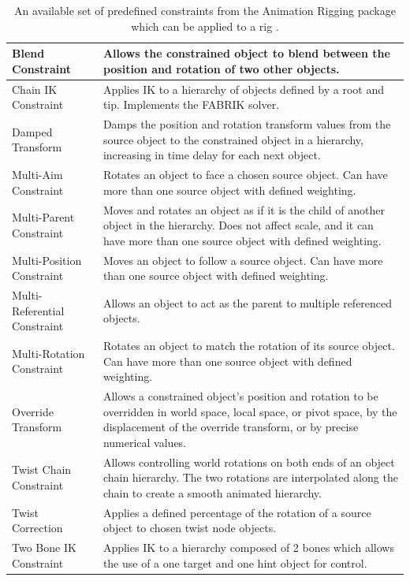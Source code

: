 \begin{table}
    \centering
    \begin{tabular} { |m{5cm}|m{10cm}| }
        \hline
        Blend Constraint & \footnotesize Allows the constrained object to blend
        between the position and rotation of two other objects. \\
        \hline
        Chain IK Constraint & \footnotesize Applies IK to a hierarchy of objects
        defined by a root and tip. Implements the FABRIK solver. \\
        \hline
        Damped Transform & \footnotesize Damps the position and rotation
        transform values from the source object to the constrained object in
        a hierarchy, increasing in time delay for each next object. \\
        \hline
        Multi-Aim Constraint & \footnotesize Rotates an object to face a chosen
        source object. Can have more than one source object with defined
        weighting. \\
        \hline
        Multi-Parent Constraint & \footnotesize Moves and rotates an object as
        if it is the child of another object in the hierarchy. Does not affect
        scale, and it can have more than one source object with defined
        weighting. \\
        \hline
        Multi-Position Constraint & \footnotesize Moves an object to follow
        a source object. Can have more than one source object with defined
        weighting. \\
        \hline
        Multi-Referential Constraint & \footnotesize Allows an object to act as
        the parent to multiple referenced objects.\\
        \hline
        Multi-Rotation Constraint & \footnotesize Rotates an object to match the
        rotation of its source object. Can have more than one source object with
        defined weighting. \\
        \hline
        Override Transform & \footnotesize Allows a constrained object's
        position and rotation to be overridden in world space, local space, or
        pivot space, by the displacement of the override transform, or by
        precise numerical values. \\
        \hline
        Twist Chain Constraint & \footnotesize Allows controlling world
        rotations on both ends of an object chain hierarchy. The two rotations
        are interpolated along the chain to create a smooth animated hierarchy.
        \\
        \hline
        Twist Correction & \footnotesize Applies a defined percentage of the
        rotation of a source object to chosen twist node objects. \\
        \hline
        Two Bone IK Constraint & \footnotesize Applies IK to a hierarchy
        composed of 2 bones which allows the use of a one target and one hint
        object for control. \\
        \hline

    \end{tabular}
    \caption{An available set of predefined constraints from the Animation
    Rigging package which can be applied to a rig
\cite{unity_animation_rigging}.}
    \label{tbl:ar_constraints}
\end{table}
